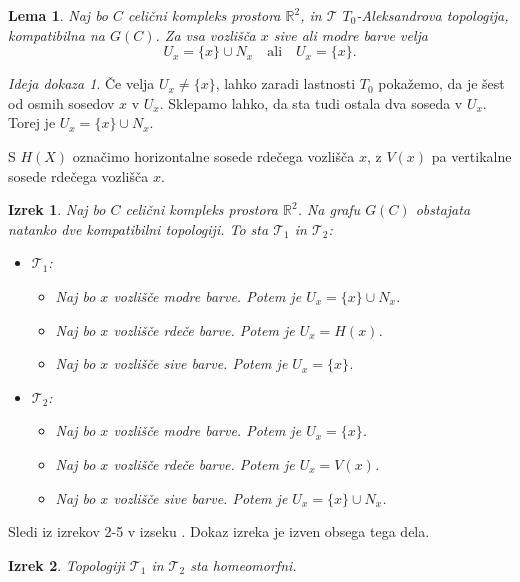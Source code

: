 \documentclass[a4paper, 12pt]{book}
\newtheorem{theorem}{Izrek}[section]
\newtheorem{lemma}{Lema}[section]
\theoremstyle{definition}
\theoremstyle{remark}
\newtheorem*{sketch}{Ideja dokaza}
\begin{document}
\begin{lemma}
  Naj bo $C$ celični kompleks prostora $\mathbb{R}^2$, in $\mathcal{T}$ $T_0$-Aleksandrova
  topologija, kompatibilna na $G(C)$. Za vsa vozlišča $x$ sive ali modre barve velja
  \[U_x = \{x\} \cup N_x \quad \text{ali} \quad U_x = \{x\}\text{.}\]
\end{lemma}
\begin{sketch}
  Če velja $U_x \neq \{x\}$, lahko zaradi lastnosti $T_0$ pokažemo, da je šest od
  osmih sosedov $x$ v $U_x$. Sklepamo lahko, da sta tudi ostala dva soseda v $U_x$.
  Torej je $U_x = \{x\} \cup N_x$.
\end{sketch}

S $H(X)$ označimo horizontalne sosede rdečega vozlišča $x$, z $V(x)$ pa vertikalne
sosede rdečega vozlišča $x$.\\
\begin{theorem}
  Naj bo $C$ celični kompleks prostora $\mathbb{R}^2$. Na grafu $G(C)$ obstajata
  natanko dve kompatibilni topologiji. To sta $\mathcal{T}_1$ in $\mathcal{T}_2$:
  \begin{itemize}
    \item $\mathcal{T}_1$:
      \begin{itemize}
        \item Naj bo $x$ vozlišče modre barve. Potem je $U_x = \{x\} \cup N_x$.
        \item Naj bo $x$ vozlišče rdeče barve. Potem je $U_x = H(x)$.
        \item Naj bo $x$ vozlišče sive barve. Potem je $U_x = \{x\}$.
      \end{itemize}
      \item $\mathcal{T}_2$:
      \begin{itemize}
        \item Naj bo $x$ vozlišče modre barve. Potem je $U_x = \{x\}$.
        \item Naj bo $x$ vozlišče rdeče barve. Potem je $U_x = V(x)$.
        \item Naj bo $x$ vozlišče sive barve. Potem je $U_x = \{x\} \cup N_x$.
      \end{itemize}
  \end{itemize}
\end{theorem}
Sledi iz izrekov 2-5 v izseku .
Dokaz izreka je izven obsega tega dela.
\begin{theorem}
  Topologiji $\mathcal{T}_1$ in $\mathcal{T}_2$ sta homeomorfni.
\end{theorem}
\end{document}
